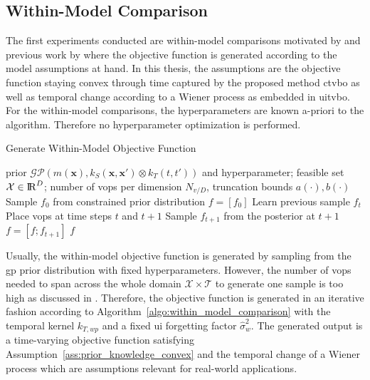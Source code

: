 \subsection{Within-Model Comparison}
\label{sec:within-model}

The first experiments conducted are within-model comparisons motivated by \textcite{Hennig_2012} and previous work by \textcite{Bogunovic_2016} where the objective function is generated according to the model assumptions at hand. In this thesis, the assumptions are the objective function staying convex through time captured by the proposed method \gls{ctvbo} as well as temporal change according to a Wiener process as embedded in \gls{uitvbo}. For the within-model comparisons, the hyperparameters are known a-priori to the algorithm. Therefore no hyperparameter optimization is performed.

\begin{algorithm}[h]
\centering
\caption{Generate Within-Model Objective Function}
\begin{algorithmic}[1]
\Require prior $\mathcal{GP}(m(\mathbf{x}), k_S(\mathbf{x},\mathbf{x}') \otimes k_T(t, t'))$ and hyperparameter; feasible set ${\mathcal{X}\in \mathrm{I\!R}^D}$; number of \glspl{vop} per dimension $N_{v/D}$, truncation bounds $a(\cdot), b(\cdot)$
\State Sample $f_0$ from constrained prior distribution 
\State $f = [f_0]$
    \State Learn previous sample $f_t$
    \State Place \glspl{vop} at time steps $t$ and $t+1$
    \State Sample $f_{t+1}$ from the posterior at $t+1$
    \State $f = [f;f_{t+1}]$
\EndFor
\Ensure $f$
\end{algorithmic}
\label{algo:within_model_comparison}
\end{algorithm}

Usually, the within-model objective function is generated by sampling from the \gls{gp} prior distribution with fixed hyperparameters. However, the number of \glspl{vop} needed to span across the whole domain $\mathcal{X}\times\mathcal{T}$ to generate one sample is too high as discussed in . Therefore, the objective function is generated in an iterative fashion according to Algorithm~\ref{algo:within_model_comparison} with the temporal kernel $k_{T,wp}$ and a fixed \gls{ui} forgetting factor $\hat{\sigma}_w^2$. The generated output is a time-varying objective function satisfying Assumption~\ref{ass:prior_knowledge_convex} and the temporal change of a Wiener process which are assumptions relevant for real-world applications.

